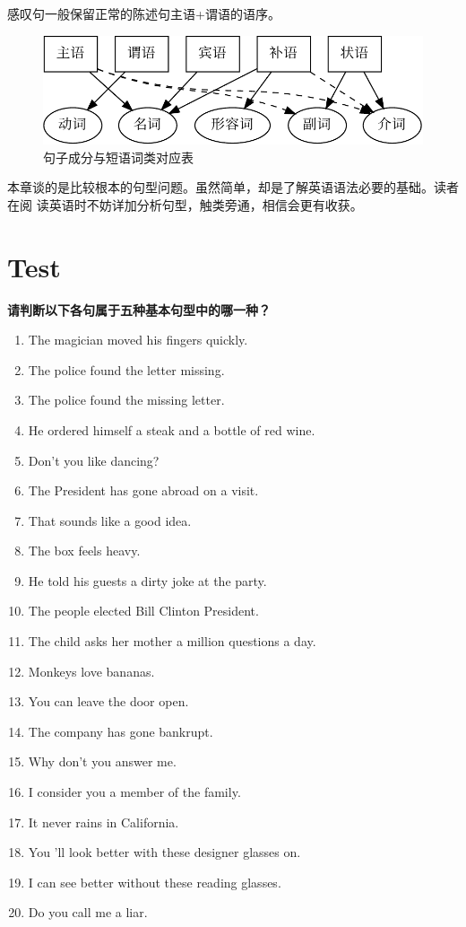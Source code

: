 感叹句一般保留正常的陈述句主语+谓语的语序。

\begin{figure}[ht]
  \centering
  \includegraphics[width=0.7\linewidth]{svo.pdf}
  \caption{\label{fig:svo}句子成分与短语词类对应表}
\end{figure}

本章谈的是比较根本的句型问题。虽然简单，却是了解英语语法必要的基础。读者在阅
读英语时不妨详加分析句型，触类旁通，相信会更有收获。

\section{Test}

\textbf{请判断以下各句属于五种基本句型中的哪一种？}

\begin{enumerate}
\item The magician moved his fingers quickly.
\item The police found the letter missing.
\item The police found the missing letter.
\item He ordered himself a steak and a bottle of red wine.
\item Don't you like dancing?
\item The President has gone abroad on a visit.
\item That sounds like a good idea.
\item The box feels heavy.
\item He told his guests a dirty joke at the party.
\item The people elected Bill Clinton President.
\item The child asks her mother a million questions a day.
\item Monkeys love bananas.
\item You can leave the door open.
\item The company has gone bankrupt.
\item Why don't you answer me.
\item I consider you a member of the family.
\item It never rains in California.
\item You 'll look better with these designer glasses on.
\item I can see better without these reading glasses.
\item Do you call me a liar.
\end{enumerate}

